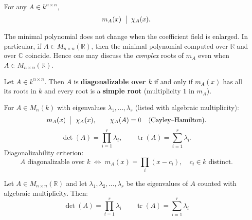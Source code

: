 \begin{corbox}
For any $A \in k^{n \times n}$,
\[
  m_A(x) \;\bigm|\; \chi_A(x).
\]
\end{corbox}

\begin{propbox}
The minimal polynomial does not change when the coefficient field is
enlarged.  In particular, if $A \in M_{n \times n}(\mathbb{R})$, then the
minimal polynomial computed over $\mathbb{R}$ and over $\mathbb{C}$ coincide.  Hence
one may discuss the \emph{complex} roots of $m_A$ even when
$A \in M_{n \times n}(\mathbb{R})$.
\end{propbox}

\begin{propbox}
Let $A \in k^{n \times n}$.  Then $A$ is \textbf{diagonalizable
over $k$} if and only if $m_A(x)$ has all its roots in $k$
and every root is a \textbf{simple root} (multiplicity $1$ in $m_A$).
\end{propbox}

\begin{flowbox}
For $A \in M_{n}(k)$ with eigenvalues $\lambda_1, \ldots, \lambda_r$
(listed with algebraic multiplicity):
\[
  m_A(x) \;\bigm|\; \chi_A(x),
  \qquad
  \chi_A(A) = 0 \quad\text{(Cayley--Hamilton)}.
\]
\[
  \det(A) = \prod_{i=1}^{r}\lambda_i,
  \qquad
  \operatorname{tr}(A) = \sum\limits_{i=1}^{r}\lambda_i.
\]
Diagonalizability criterion:
\[
  A \text{ diagonalizable over } k
  \;\iff\;
  m_A(x) = \prod_{i}(x - c_i), \quad c_i \in k \text{ distinct.}
\]
\end{flowbox}

\begin{tipbox}
Let $A \in M_{n \times n}(\mathbb{R})$ and let $\lambda_1, \lambda_2, \ldots,
\lambda_r$ be the eigenvalues of $A$ counted with algebraic
multiplicity.  Then:
\begin{equation*}
   \det(A) = \displaystyle\prod_{i=1}^{r} \lambda_i \qquad \operatorname{tr}(A) = \displaystyle\sum\limits_{i=1}^{r} \lambda_i
\end{equation*}
\end{tipbox}